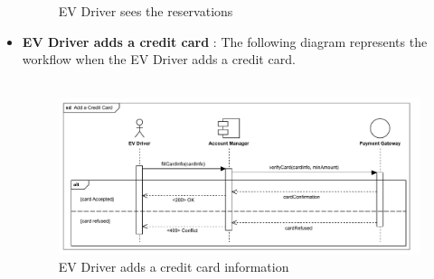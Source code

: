 \begin{itemize}
\begin{figure}[H]
        \caption{EV Driver sees the reservations}
    \end{figure}
    \pagebreak
    \item \textbf{EV Driver adds a credit card} : The following diagram represents the workflow when the EV Driver adds a credit card.\\
    \\
    \begin{figure}[H]
        \centering
        \includegraphics[scale=0.55]{src/runtimeVIew/eMSP_AddCC.pdf}
        \caption{EV Driver adds a credit card information}
    \end{figure}
\end{itemize}

